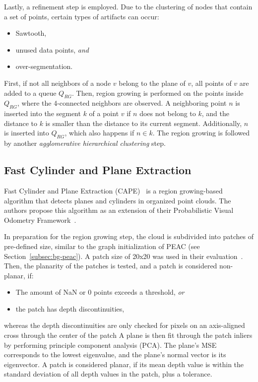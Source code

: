 \documentclass[main.tex]{subfiles}
\begin{document}
Lastly, a refinement step is employed. Due to the clustering of nodes that contain a set of points, certain types of
artifacts can occur:
\begin{itemize}
    \item Sawtooth,
    \item unused data points, \textit{and}
    \item over-segmentation.
\end{itemize}
First, if not all neighbors of a node $v$ belong to the plane of $v$, all points of $v$ are added to a queue $Q_{RG}$.
Then, region growing is performed on the points inside $Q_{RG}$, where the 4-connected neighbors are observed.
A neighboring point $n$ is inserted into the segment $k$ of a point $v$ if $n$ does not belong to $k$, and
the distance to $k$ is smaller than the distance to its current segment. Additionally, $n$ is inserted into $Q_{RG}$,
which also happens if $n \in k$.
The region growing is followed by another \textit{agglomerative hierarchical clustering} step.


\subsection{Fast Cylinder and Plane Extraction}
\label{subsec:bg-cape}
Fast Cylinder and Plane Extraction (CAPE)~\cite{Proença_Gao_2018} is a region growing-based algorithm that detects
planes and cylinders in organized point clouds.
The authors propose this algorithm as an extension of their Probabilistic Visual Odometry Framework~\cite{Proenca_Gao_2018}.

In preparation for the region growing step, the cloud is subdivided into patches of pre-defined size, similar to
the graph initialization of PEAC (see Section~\ref{subsec:bg-peac}).
A patch size of 20x20 was used in their evaluation~\cite[Section~V.A]{Proença_Gao_2018}.
Then, the planarity of the patches is tested, and a patch is considered non-planar, if:
\begin{itemize}
    \item The amount of NaN or 0 points exceeds a threshold, \textit{or}
    \item the patch has depth discontinuities,
\end{itemize}
whereas the depth discontinuities are only checked for pixels on an axis-aligned cross through the center of the patch
A plane is then fit through the patch inliers by performing principle component analysis (PCA). The plane's MSE
corresponds to the lowest eigenvalue, and the plane's normal vector is its eigenvector.
A patch is considered planar, if its mean depth value is within the standard deviation of all depth values in the patch, plus a tolerance.
\end{document}
